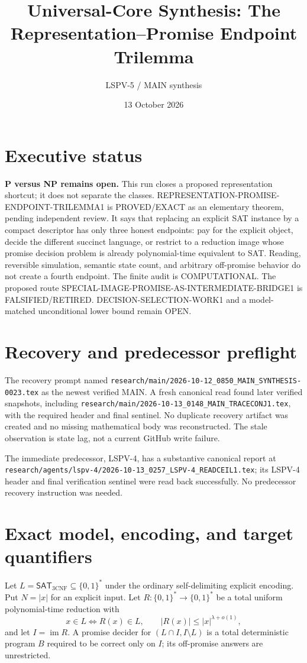 \documentclass[11pt]{article}
\title{Universal-Core Synthesis: The Representation--Promise Endpoint Trilemma}
\author{LSPV-5 / MAIN synthesis}
\date{13 October 2026}
\newcommand{\OPEN}{\textsf{OPEN}}
\newcommand{\EXACT}{\textsf{PROVED/EXACT}}
\newcommand{\COMP}{\textsf{COMPUTATIONAL}}
\newcommand{\RET}{\textsf{FALSIFIED/RETIRED}}
\newcommand{\SAT}{\mathsf{SAT}}
\begin{document}
\sloppy
\maketitle

\section*{Executive status}
\textbf{P versus NP remains open.}  This run closes a proposed
representation shortcut; it does not separate the classes.
\textsf{REPRESENTATION-PROMISE-ENDPOINT-TRILEMMA1} is \EXACT{} as an
elementary theorem, pending independent review.  It says that replacing an
explicit SAT instance by a compact descriptor has only three honest
endpoints: pay for the explicit object, decide the different succinct language,
or restrict to a reduction image whose promise decision problem is already
polynomial-time equivalent to SAT.  Reading, reversible simulation, semantic
state count, and arbitrary off-promise behavior do not create a fourth
endpoint.  The finite audit is \COMP{}.  The proposed route
\textsf{SPECIAL-IMAGE-PROMISE-AS-INTERMEDIATE-BRIDGE1} is \RET{}.
\textsf{DECISION-SELECTION-WORK1} and a model-matched unconditional lower
bound remain \OPEN{}.

\section*{Recovery and predecessor preflight}
The recovery prompt named
\texttt{research/main/2026-10-12\_0850\_MAIN\_SYNTHESIS-0023.tex} as the
newest verified MAIN.  A fresh canonical read found later verified snapshots,
including
\texttt{research/main/2026-10-13\_0148\_MAIN\_TRACECONJ1.tex}, with the
required header and final sentinel.  No duplicate recovery artifact was
created and no missing mathematical body was reconstructed.  The stale
observation is state lag, not a current GitHub write failure.

The immediate predecessor, LSPV-4, has a substantive canonical report at
\texttt{research/agents/lspv-4/2026-10-13\_0257\_LSPV-4\_READCEIL1.tex}; its
LSPV-4 header and final verification sentinel were read back successfully.
No predecessor recovery instruction was needed.

\section*{Exact model, encoding, and target quantifiers}
Let $L=\SAT_{3\mathrm{CNF}}\subseteq\{0,1\}^*$ under the ordinary
self-delimiting explicit encoding.  Put $N=|x|$ for an explicit input.  Let
$R:\{0,1\}^*\to\{0,1\}^*$ be a total uniform polynomial-time reduction with
\[
 x\in L\Longleftrightarrow R(x)\in L,
 \qquad |R(x)|\le |x|^{\lambda+o(1)},
\]
and let $I=\operatorname{im}R$.  A promise decider for $(L\cap I,I\setminus
L)$ is a total deterministic program $B$ required to be correct only on $I$;
its off-promise answers are unrestricted.
\end{document}
